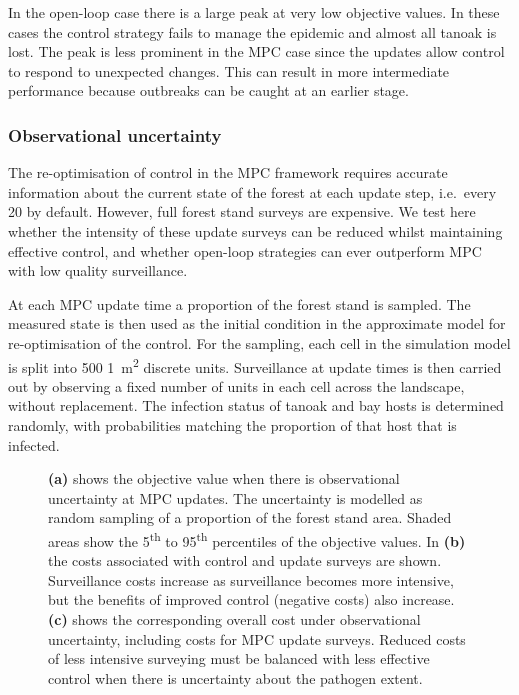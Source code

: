 In the open-loop case there is a large peak at very low objective values. In these cases the control strategy fails to manage the epidemic and almost all tanoak is lost. The peak is less prominent in the MPC case since the updates allow control to respond to unexpected changes. This can result in more intermediate performance because outbreaks can be caught at an earlier stage.

\FloatBarrier
\subsubsection{Observational uncertainty}

The re-optimisation of control in the MPC framework requires accurate information about the current state of the forest at each update step, i.e.\ every \SI{20}{\years} by default. However, full forest stand surveys are expensive. We test here whether the intensity of these update surveys can be reduced whilst maintaining effective control, and whether open-loop strategies can ever outperform MPC with low quality surveillance.

At each MPC update time a proportion of the forest stand is sampled. The measured state is then used as the initial condition in the approximate model for re-optimisation of the control. For the sampling, each cell in the simulation model is split into 500 \SI{1}{\meter\squared} discrete units. Surveillance at update times is then carried out by observing a fixed number of units in each cell across the landscape, without replacement. The infection status of tanoak and bay hosts is determined randomly, with probabilities matching the proportion of that host that is infected.

\begin{figure}[t]
    \begin{center}
        \caption[Performance of MPC under observational uncertainty]{\textbf{(a)} shows the objective value when there is observational uncertainty at MPC updates. The uncertainty is modelled as random sampling of a proportion of the forest stand area. Shaded areas show the 5\textsuperscript{th} to 95\textsuperscript{th} percentiles of the objective values. In \textbf{(b)} the costs associated with control and update surveys are shown. Surveillance costs increase as surveillance becomes more intensive, but the benefits of improved control (negative costs) also increase. \textbf{(c)} shows the corresponding overall cost under observational uncertainty, including costs for MPC update surveys. Reduced costs of less intensive surveying must be balanced with less effective control when there is uncertainty about the pathogen extent.\label{fig:ch6:obs_uncert}}
    \end{center}
\end{figure}

